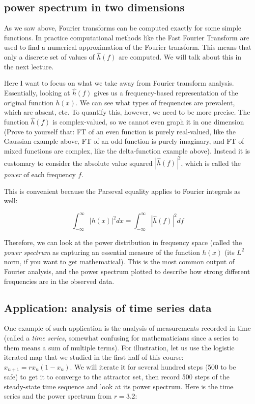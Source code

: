 \documentclass[
  letterpaper,
  DIV=11,
  numbers=noendperiod]{scrreprt}
\begin{document}
\subsection{power spectrum in two
dimensions}\label{power-spectrum-in-two-dimensions}

As we saw above, Fourier transforms can be computed exactly for some
simple functions. In practice computational methods like the Fast
Fourier Transform are used to find a numerical approximation of the
Fourier transform. This means that only a discrete set of values of
\(\widehat h(f)\) are computed. We will talk about this in the next
lecture.

Here I want to focus on what we take away from Fourier transform
analysis. Essentially, looking at \(\widehat h(f)\) gives us a
frequency-based representation of the original function \(h(x)\). We can
see what types of frequencies are prevalent, which are absent, etc. To
quantify this, however, we need to be more precise. The function
\(\widehat h(f)\) is complex-valued, so we cannot even graph it in one
dimension (Prove to yourself that: FT of an even function is purely
real-valued, like the Gaussian example above, FT of an odd function is
purely imaginary, and FT of mixed functions are complex, like the
delta-function example above). Instead it is customary to consider the
absolute value squared \(|\widehat h(f)|^2\), which is called the
\emph{power} of each frequency \(f\).

This is convenient because the Parseval equality applies to Fourier
integrals as well:

\[ 
\int_{-\infty}^\infty |h(x)|^2 dx =  \int_{-\infty}^\infty |\widehat h(f)|^2 df 
\]

Therefore, we can look at the power distribution in frequency space
(called the \emph{power spectrum} as capturing an essential measure of
the function \(h(x)\) (its \(L^2\) norm, if you want to get
mathematical). This is the most common output of Fourier analysis, and
the power spectrum plotted to describe how strong different frequencies
are in the observed data.

\subsection{Application: analysis of time series
data}\label{application-analysis-of-time-series-data}

One example of such application is the analysis of measurements recorded
in time (called a \emph{time series}, somewhat confusing for
mathematicians since a series to them means a sum of multiple terms).
For illustration, let us use the logistic iterated map that we studied
in the first half of this course: \(x_{n+1} = rx_n(1-x_n)\). We will
iterate it for several hundred steps (500 to be safe) to get it to
converge to the attractor set, then record 500 steps of the steady-state
time sequence and look at its power spectrum. Here is the time series
and the power spectrum from \(r=3.2\):
\end{document}
